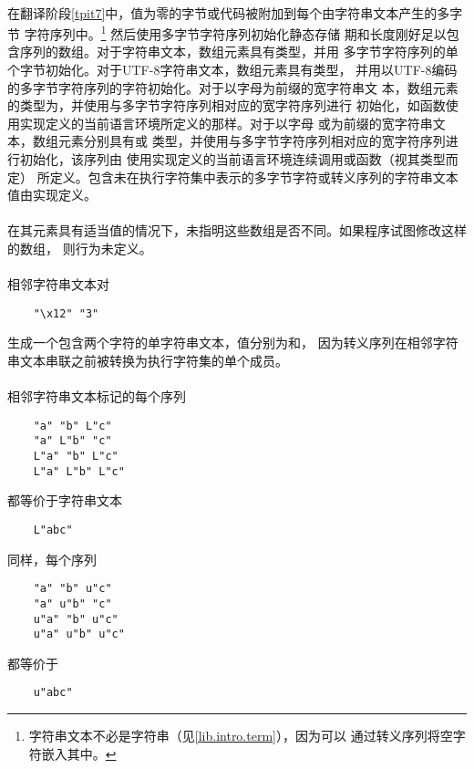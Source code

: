 {\paragraph{}
在翻译阶段\ref{tpit7}中，值为零的字节或代码被附加到每个由字符串文本产生的多字节
字符序列中。\footnote{字符串文本不必是字符串（见\ref{lib.intro.term}），因为可以
通过转义序列将空字符嵌入其中。}  然后使用多字节字符序列初始化静态存储
期和长度刚好足以包含序列的数组。对于字符串文本，数组元素具有类型，并用
多字节字符序列的单个字节初始化。对于UTF-8字符串文本，数组元素具有类型，
并用以UTF-8编码的多字节字符序列的字符初始化。对于以字母为前缀的宽字符串文
本，数组元素的类型为，并使用与多字节字符序列相对应的宽字符序列进行
初始化，如函数使用实现定义的当前语言环境所定义的那样。对于以字母
或为前缀的宽字符串文本，数组元素分别具有或
类型，并使用与多字节字符序列相对应的宽字符序列进行初始化，该序列由
使用实现定义的当前语言环境连续调用或函数（视其类型而定）
所定义。包含未在执行字符集中表示的多字节字符或转义序列的字符串文本值由实现定义。

\paragraph{}
在其元素具有适当值的情况下，未指明这些数组是否不同。如果程序试图修改这样的数组，
则行为未定义。

\paragraph{}
\ex 相邻字符串文本对
\begin{lstlisting}
    "\x12" "3"
\end{lstlisting}
生成一个包含两个字符的单字符串文本，值分别为和\tm{\sq 3\sq}，
因为转义序列在相邻字符串文本串联之前被转换为执行字符集的单个成员。

\paragraph{}
\ex 相邻字符串文本标记的每个序列
\begin{lstlisting}
    "a" "b" L"c"
    "a" L"b" "c"
    L"a" "b" L"c"
    L"a" L"b" L"c"
\end{lstlisting}
都等价于字符串文本
\begin{lstlisting}
    L"abc"
\end{lstlisting}
同样，每个序列
\begin{lstlisting}
    "a" "b" u"c"
    "a" u"b" "c"
    u"a" "b" u"c"
    u"a" u"b" u"c"
\end{lstlisting}
都等价于
\begin{lstlisting}
    u"abc"
\end{lstlisting}

}
